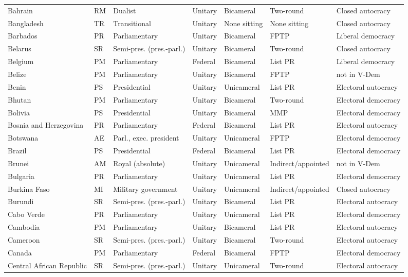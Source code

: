 \documentclass[11pt,a4paper]{article}
\begin{document}
{\begin{longtable}{p{2.9cm}lp{2.9cm}p{2.4cm}lp{1.9cm}p{2.0cm}}
Bahrain & RM & Dualist & Unitary & Bicameral & Two-round & Closed autocracy\\
Bangladesh & TR & Transitional & Unitary & None sitting & None sitting & Closed autocracy\\
Barbados & PR & Parliamentary & Unitary & Bicameral & FPTP & Liberal democracy\\
Belarus & SR & Semi-pres. (pres.-parl.) & Unitary & Bicameral & Two-round & Closed autocracy\\
Belgium & PM & Parliamentary & Federal & Bicameral & List PR & Liberal democracy\\
Belize & PM & Parliamentary & Unitary & Bicameral & FPTP & not in V-Dem\\
Benin & PS & Presidential & Unitary & Unicameral & List PR & Electoral autocracy\\
Bhutan & PM & Parliamentary & Unitary & Bicameral & Two-round & Electoral democracy\\
Bolivia & PS & Presidential & Unitary & Bicameral & MMP & Electoral democracy\\
Bosnia and Herzegovina & PR & Parliamentary & Federal & Bicameral & List PR & Electoral autocracy\\
Botswana & AE & Parl., exec. president & Unitary & Unicameral & FPTP & Electoral democracy\\
Brazil & PS & Presidential & Federal & Bicameral & List PR & Electoral democracy\\
Brunei & AM & Royal (absolute) & Unitary & Unicameral & Indirect/appointed & not in V-Dem\\
Bulgaria & PR & Parliamentary & Unitary & Unicameral & List PR & Electoral democracy\\
Burkina Faso & MI & Military government & Unitary & Unicameral & Indirect/appointed & Closed autocracy\\
Burundi & SR & Semi-pres. (pres.-parl.) & Unitary & Bicameral & List PR & Electoral autocracy\\
Cabo Verde & PR & Parliamentary & Unitary & Unicameral & List PR & Electoral democracy\\
Cambodia & PM & Parliamentary & Unitary & Bicameral & List PR & Electoral autocracy\\
Cameroon & SR & Semi-pres. (pres.-parl.) & Unitary & Bicameral & Two-round & Electoral autocracy\\
Canada & PM & Parliamentary & Federal & Bicameral & FPTP & Electoral democracy\\
Central African Republic & SR & Semi-pres. (pres.-parl.) & Unitary & Unicameral & Two-round & Electoral autocracy\\

\end{longtable}}
\end{document}
